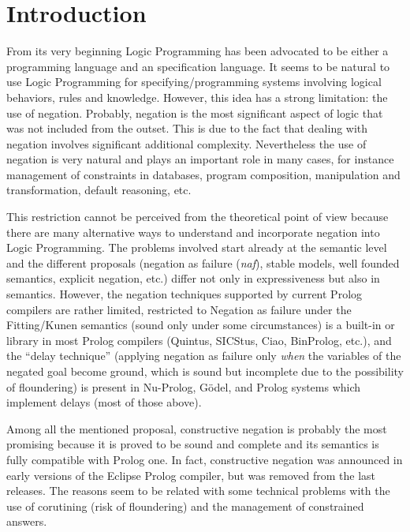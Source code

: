 \documentclass{llncs}
\newcommand{\naf}{{\em naf}}\newcommand{\viejo}[1]{}
\begin{document}

\section{Introduction}
\label{introduction}
From its very beginning Logic Programming has been advocated to be either
a programming language and an specification language. 
It seems to be natural to use Logic Programming for specifying/programming systems
involving logical behaviors, rules and knowledge. However, this idea has a strong
limitation: the use of negation.
Probably,
negation is the most significant aspect of logic that was not included
from the outset. This is due to the fact that dealing with negation
involves significant additional complexity. 
Nevertheless the use of negation is very natural and plays an important role 
in many cases, for instance management of constraints in databases, program
composition, manipulation and transformation, default reasoning,
etc.

This restriction cannot be perceived from the theoretical point of
view because there are many alternative ways to understand and
incorporate negation into Logic Programming. The problems involved
start already at the semantic level and the different proposals
(negation as failure (\naf), stable models, well founded semantics,
explicit negation, etc.)  differ not only in expressiveness but also
in semantics.  However, the negation techniques supported by current
Prolog compilers are rather limited, restricted to Negation as failure
under the Fitting/Kunen semantics (sound only under some
circumstances) is a built-in or library in most Prolog compilers
(Quintus, SICStus, Ciao, BinProlog, etc.), and the ``delay technique''
(applying negation as failure only \emph{when} the variables of the
negated goal become ground, which is sound but incomplete due to the
possibility of floundering) is present in Nu-Prolog, G\"odel, and
Prolog systems which implement delays (most of those above).

Among all the mentioned proposal, constructive negation is probably the most 
promising because it is proved to be sound and complete and
its semantics is fully compatible with Prolog one. In fact, 
constructive negation was announced in early versions of the 
Eclipse Prolog compiler, but was removed from the last releases.
The reasons seem to be related with some technical problems with the use
of corutining (risk of floundering) and the management of constrained answers.
\end{document}

